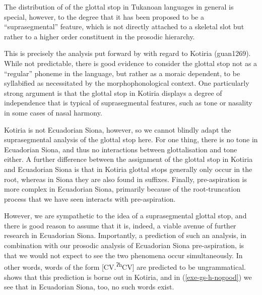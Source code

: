 \documentclass[output=paper]{langscibook}
\begin{document}
The distribution of of the glottal stop in Tukanoan languages in general is special, however, to the degree that it has been proposed to be a ``suprasegmental'' feature, which is not directly attached to a skeletal slot but rather to a higher order constituent in the prosodic hierarchy.

This is precisely the analysis put forward by \citet{Stenzel:2007} with regard to Kotiria (guan1269). While not predictable, there is good evidence to consider the glottal stop not as a ``regular'' phoneme in the language, but rather as a moraic dependent, to be syllabified as necessitated by the morphophonological context. One particularly strong argument is that the glottal stop in Kotiria displays a degree of independence that is typical of suprasegmental features, such as tone or nasality in some cases of nasal harmony.

Kotiria is not Ecuadorian Siona, however, so we cannot blindly adapt the suprasegmental analysis of the glottal stop here. For one thing, there is no tone in Ecuadorian Siona, and thus no interactions between glottalisation and tone either. A further difference between the assignment of the glottal stop in Kotiria and Ecuadorian Siona is that in Kotiria glottal stops generally only occur in the root, whereas in Siona they are also found in suffixes. Finally, pre-aspiration is more complex in Ecuadorian Siona, primarily because of the root-truncation process that we have seen interacts with pre-aspiration.

However, we are sympathetic to the idea of a suprasegmental glottal stop, and there is good reason to assume that it is, indeed, a viable avenue of further research in Ecuadorian Siona. Importantly, a prediction of such an analysis, in combination with our prosodic analysis of Ecuadorian Siona pre-aspiration, is that we would not expect to see the two phenomena occur simultaneously. In other words, words of the form [CV.\textsuperscript{ʔh}CV] are predicted to be ungrammatical. \citet{Stenzel:2007} shows that this prediction is borne out in Kotiria, and in (\ref{exe-gs-h-nogood}) we see that in Ecuadorian Siona, too, no such words exist.
\end{document}
